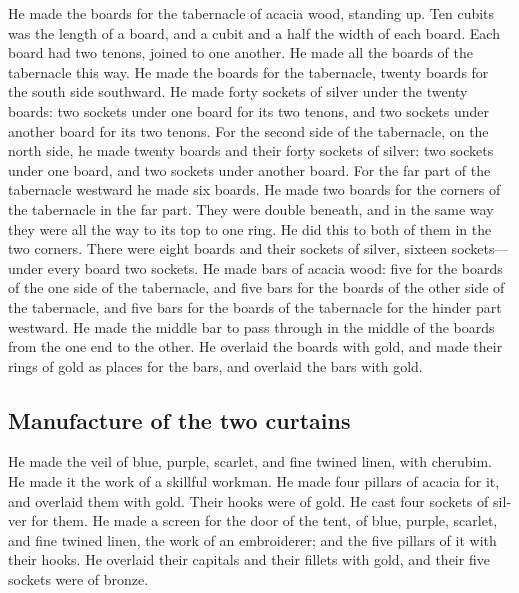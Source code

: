 \begin{paracol}{2}
\begin{otherlanguage}{english}
 He made the boards for the tabernacle of acacia wood,
standing up.  Ten cubits was the length of a board, and a
cubit and a half the width of each board.  Each board had
two tenons, joined to one another. He made all the boards of the
tabernacle this way.  He made the boards for the
tabernacle, twenty boards for the south side southward. 
He made forty sockets of silver under the twenty boards: two sockets
under one board for its two tenons, and two sockets under another board
for its two tenons.  For the second side of the
tabernacle, on the north side, he made twenty boards  and
their forty sockets of silver: two sockets under one board, and two
sockets under another board.  For the far part of the
tabernacle westward he made six boards.  He made two
boards for the corners of the tabernacle in the far part.
 They were double beneath, and in the same way they were
all the way to its top to one ring. He did this to both of them in the
two corners.  There were eight boards and their sockets
of silver, sixteen sockets---under every board two sockets.
 He made bars of acacia wood: five for the boards of the
one side of the tabernacle,  and five bars for the boards
of the other side of the tabernacle, and five bars for the boards of the
tabernacle for the hinder part westward.  He made the
middle bar to pass through in the middle of the boards from the one end
to the other.  He overlaid the boards with gold, and made
their rings of gold as places for the bars, and overlaid the bars with
gold.

\hypertarget{manufacture-of-the-two-curtains}{%
\subsection{Manufacture of the two
curtains}\label{manufacture-of-the-two-curtains}}

 He made the veil of blue, purple, scarlet, and fine
twined linen, with cherubim. He made it the work of a skillful workman.
 He made four pillars of acacia for it, and overlaid them
with gold. Their hooks were of gold. He cast four sockets of silver for
them.  He made a screen for the door of the tent, of
blue, purple, scarlet, and fine twined linen, the work of an
embroiderer;  and the five pillars of it with their
hooks. He overlaid their capitals and their fillets with gold, and their
five sockets were of bronze.


\end{otherlanguage}
\end{paracol}
